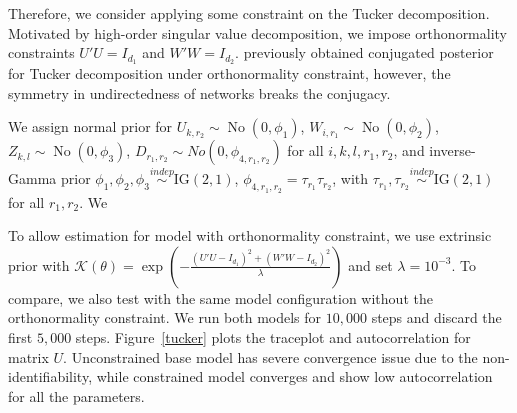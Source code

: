 \documentclass[10pt]{article}
\newcommand{\mc}[1]{\mathcal{#1}}
\DeclareMathOperator{\No}{No}
\DeclareMathOperator{\1}{\mathbbm{1}}
\begin{document}
Therefore, we consider applying some constraint on the Tucker decomposition. Motivated by high-order singular value decomposition, we impose orthonormality constraints $U'U=I_{d_1}$ and $W'W=I_{d_2}$. \cite{hoff2016equivariant} previously obtained conjugated posterior for Tucker decomposition under orthonormality constraint, however, the symmetry in undirectedness of networks breaks the conjugacy.

We assign normal prior for $U_{k,r_2}\sim \No(0,\phi_{1})$, $W_{i,r_1}\sim \No(0,\phi_2)$, $Z_{k,l}\sim \No(0,\phi_3)$, $D_{r_1,r_2}\sim No(0, \phi_{4,r_1,r_2})$ for all $i,k,l,r_1,r_2$, and inverse-Gamma prior $\phi_1,\phi_2,\phi_3\stackrel{indep}{\sim} \text{IG}(2,1)$, $\phi_{4,r_1,r_2}= \tau_{r_1}\tau_{r_2}$, with $\tau_{r_1},\tau_{r_2}\stackrel{indep}{\sim} \text{IG}(2,1)$ for all $r_1,r_2$. We


To allow estimation for model with orthonormality constraint, we use extrinsic prior with $\mc K(\theta) = \exp( - \frac{(U'U-I_{d_1})^2 + (W'W-I_{d_2})^2  }{\lambda})$ and set $\lambda=10^{-3}$. To compare, we also test with the same model configuration without the orthonormality constraint. We run both models for $10,000$ steps and discard the first $5,000$ steps. Figure~\ref{tucker} plots the traceplot and autocorrelation for matrix $U$. Unconstrained base model has severe convergence issue due to the non-identifiability, while constrained model converges and show low autocorrelation for all the parameters.
\end{document}

